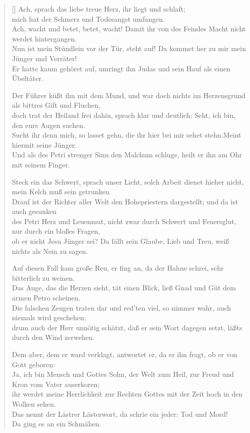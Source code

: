 \begin{center}
\begin{verse}[\versewidth]
 \flqq Ach\frqq, sprach das liebe treue Herz, \flqq ihr liegt und schlaft;\\
mich hat der Schmerz und Todesangst umfangen.\\
Ach, wacht und betet, betet, wacht! Damit ihr von des Feindes Macht nicht werdet hintergangen.\\
Nun ist mein Stündlein vor der Tür, steht auf! Da kommet her zu mir mein Jünger und Verräter!\frqq \\
Er hatte kaum gehöret auf, umringt ihn Judas und sein Hauf als einen Übeltäter.

 Der Führer küßt ihn mit dem Mund, und war doch nichts im Herzensgrund\\
als bittres Gift und Fluchen,\\
doch trat der Heiland frei dahin, sprach klar und deutlich: \flqq Seht, ich bin, den eure Augen suchen.\\
Sucht ihr denn mich, so lasset gehn, die ihr hier bei mir sehet stehn.\frqq Meint hiermit seine Jünger.\\
Und als des Petri strenger Sinn den Malchum schluge, heilt er ihn am Ohr mit seinem Finger.

 \flqq Steck ein das Schwert\frqq,  sprach unser Licht, \flqq solch Arbeit dienet hieher nicht,\\
mein Kelch muß sein getrunken.\frqq \\
Drauf ist der Richter aller Welt den Hohepriestern dargestellt; und da ist auch gesunken\\
des Petri Herz und Leuenmut, nicht zwar durch Schwert und Feuersglut, nur durch ein bloßes Fragen,\\
ob er nicht Jesu Jünger sei? Da fällt sein Glaube, Lieb und Treu, weiß nichts als Nein zu sagen.

 Auf diesen Fall kam große Reu, er fing an, da der Hahne schrei, sehr bitterlich zu weinen.\\
Das Auge, das die Herzen sieht, tät einen Blick, ließ Gnad und Güt dem armen Petro scheinen.\\
Die falschen Zeugen traten dar und red'ten viel, so nimmer wahr, auch niemals wird geschehen;\\
drum auch der Herr unnötig schätzt, daß er sein Wort dagegen setzt, läßts durch den Wind zerwehen.

 Dem aber, dem er ward verklagt, antwortet er, da er ihn fragt, ob er von Gott geboren:\\
\flqq Ja, ich bin Mensch und Gottes Sohn, der Welt zum Heil, zur Freud und Kron vom Vater auserkoren;\\
ihr werdet meine Herrlichkeit zur Rechten Gottes mit der Zeit hoch in den Wolken sehen.\frqq \\
Das nennt der Lästrer Lästerwort, da schrie ein jeder: \flqq Tod und Mord!\frqq \\
Da ging es an ein Schmähen.


\end{verse}
\end{center}
